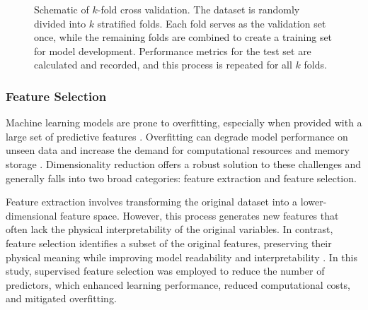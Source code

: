\documentclass[
  authoryear,
  preprint,
  1p,
  onecolumn]{elsarticle}
\begin{document}
\begin{figure}


\caption{\label{fig-k-fold}Schematic of \(k\)-fold cross validation. The
dataset is randomly divided into \(k\) stratified folds. Each fold
serves as the validation set once, while the remaining folds are
combined to create a training set for model development. Performance
metrics for the test set are calculated and recorded, and this process
is repeated for all \(k\) folds.}

\end{figure}%

\subsubsection{Feature Selection}\label{sec-feat-selection}

Machine learning models are prone to overfitting, especially when
provided with a large set of predictive features \citep{Ying_2019}.
Overfitting can degrade model performance on unseen data and increase
the demand for computational resources and memory storage
\citep{feat_selec2017}. Dimensionality reduction offers a robust
solution to these challenges and generally falls into two broad
categories: feature extraction and feature selection.

Feature extraction involves transforming the original dataset into a
lower-dimensional feature space. However, this process generates new
features that often lack the physical interpretability of the original
variables. In contrast, feature selection identifies a subset of the
original features, preserving their physical meaning while improving
model readability and interpretability \citep{feat_selec2017}. In this
study, supervised feature selection was employed to reduce the number of
predictors, which enhanced learning performance, reduced computational
costs, and mitigated overfitting.
\end{document}
